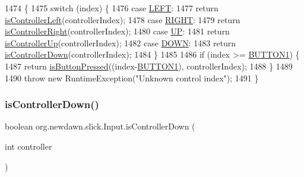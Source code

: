 \begin{DoxyCode}
1474                                                                  \{
1475         \textcolor{keywordflow}{switch} (index) \{
1476         \textcolor{keywordflow}{case} \mbox{\hyperlink{classorg_1_1newdawn_1_1slick_1_1_input_ae8f7bd1fc3af0b5464783bf25c951f1d}{LEFT}}:
1477             \textcolor{keywordflow}{return} \mbox{\hyperlink{classorg_1_1newdawn_1_1slick_1_1_input_a872615473ab4b93e0baceccb68d62787}{isControllerLeft}}(controllerIndex);
1478         \textcolor{keywordflow}{case} \mbox{\hyperlink{classorg_1_1newdawn_1_1slick_1_1_input_a0020786269096a261588ebc09af33f95}{RIGHT}}:
1479             \textcolor{keywordflow}{return} \mbox{\hyperlink{classorg_1_1newdawn_1_1slick_1_1_input_a216e74d174302d5f2656027f0983d53a}{isControllerRight}}(controllerIndex);
1480         \textcolor{keywordflow}{case} \mbox{\hyperlink{classorg_1_1newdawn_1_1slick_1_1_input_acca76c032ac2ba7a9e127c6d786530cb}{UP}}:
1481             \textcolor{keywordflow}{return} \mbox{\hyperlink{classorg_1_1newdawn_1_1slick_1_1_input_a222f2a8caf403540d14050698bfc4415}{isControllerUp}}(controllerIndex);
1482         \textcolor{keywordflow}{case} \mbox{\hyperlink{classorg_1_1newdawn_1_1slick_1_1_input_a10f811d8a5cbb57c4912f5c5b1802f62}{DOWN}}:
1483             \textcolor{keywordflow}{return} \mbox{\hyperlink{classorg_1_1newdawn_1_1slick_1_1_input_aa958c1b868e9398c8e2aeba952a67fd5}{isControllerDown}}(controllerIndex);
1484         \}
1485         
1486         \textcolor{keywordflow}{if} (index >= \mbox{\hyperlink{classorg_1_1newdawn_1_1slick_1_1_input_ae1ed38fe2059bd8915593514ceb75718}{BUTTON1}}) \{
1487             \textcolor{keywordflow}{return} \mbox{\hyperlink{classorg_1_1newdawn_1_1slick_1_1_input_a82287bcba0cef087bcb8a92f1bcd3d53}{isButtonPressed}}((index-\mbox{\hyperlink{classorg_1_1newdawn_1_1slick_1_1_input_ae1ed38fe2059bd8915593514ceb75718}{BUTTON1}}), controllerIndex);
1488         \}
1489 
1490         \textcolor{keywordflow}{throw} \textcolor{keyword}{new} RuntimeException(\textcolor{stringliteral}{"Unknown control index"});
1491     \}
\end{DoxyCode}
\mbox{\label{classorg_1_1newdawn_1_1slick_1_1_input_aa958c1b868e9398c8e2aeba952a67fd5}} 
\subsubsection{\texorpdfstring{is\+Controller\+Down()}{isControllerDown()}}
{\footnotesize\ttfamily boolean org.\+newdawn.\+slick.\+Input.\+is\+Controller\+Down (\begin{DoxyParamCaption}\item[{int}]{controller }\end{DoxyParamCaption})\hspace{0.3cm}{\ttfamily [inline]}}

